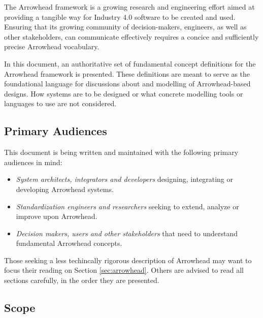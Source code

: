 %
%

The Arrowhead framework is a growing research and engineering effort aimed at providing a tangible way for Industry 4.0 software to be created and used.
Ensuring that its growing community of decision-makers, engineers, as well as other stakeholders, can communicate effectively requires a concice and sufficiently precise Arrowhead vocabulary.

In this document, an authoritative set of fundamental concept definitions for the Arrowhead framework is presented.
These definitions are meant to serve as the foundational language for discussions about and modelling of Arrowhead-based designs.
How systems are to be designed or what concrete modelling tools or languages to use are not considered.

\subsection{Primary Audiences}
\label{sec:introduction:audiences}

This document is being written and maintained with the following primary audiences in mind:

\begin{itemize}
\item \textit{System architects, integrators and developers} designing, integrating or developing Arrowhead systems.
\item \textit{Standardization engineers and researchers} seeking to extend, analyze or improve upon Arrowhead.
\item \textit{Decision makers, users and other stakeholders} that need to understand fundamental Arrowhead concepts.
\end{itemize}

Those seeking a less techincally rigorous description of Arrowhead may want to focus their reading on Section \ref{sec:arrowhead}.
Others are advised to read all sections carefully, in the order they are presented.

\subsection{Scope}
\label{sec:introduction:scope}

